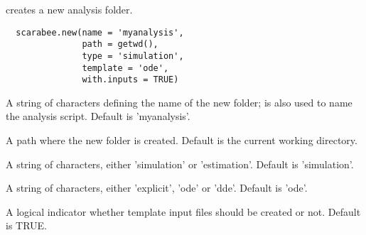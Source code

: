 %
\begin{Description}\relax
{} creates a new  analysis folder.
\end{Description}
%
\begin{Usage}
\begin{verbatim}
  scarabee.new(name = 'myanalysis',
               path = getwd(),
               type = 'simulation',
               template = 'ode',
               with.inputs = TRUE)
\end{verbatim}
\end{Usage}
%
\begin{Arguments}
\begin{ldescription}
\item[\code{name}] A string of characters defining the name of the new folder; 
 is also used to name the  analysis script. Default
is 'myanalysis'.
\item[\code{path}] A path where the new folder is created. Default is the current
working directory.
\item[\code{type}] A string of characters, either 'simulation' or 'estimation'.
Default is 'simulation'.
\item[\code{template}] A string of characters, either 'explicit', 'ode' or 'dde'.
Default is 'ode'.
\item[\code{with.inputs}] A logical indicator whether template input files should be
created or not. Default is TRUE.
\end{ldescription}
\end{Arguments}
%
